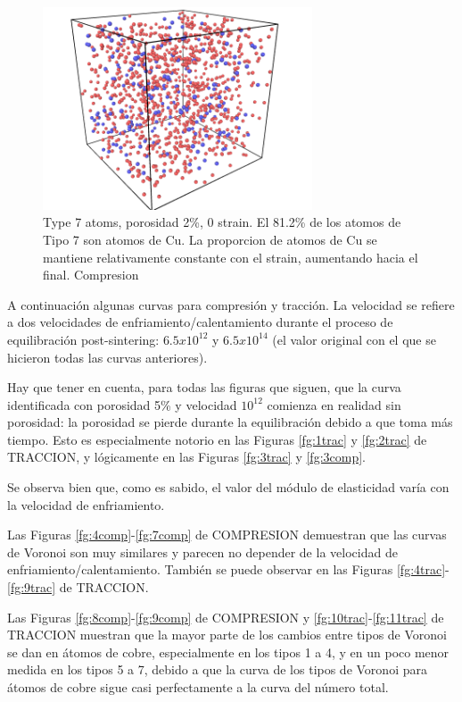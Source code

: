 \documentclass[10pt, oneside]{article} %
\begin{document}
\begin{figure}[H]
\centering
\includegraphics[width=8cm]{Figures/Porosidad_3_CU_tipo7.png}
\caption{Type 7 atoms, porosidad 2\%, 0 strain. El 81.2\% de los atomos de Tipo 7 son atomos de Cu. La proporcion de atomos de Cu se mantiene relativamente constante con el strain, aumentando hacia el final. Compresion}
\end{figure}

A continuación algunas curvas para compresión y tracción. La velocidad se refiere a dos velocidades de enfriamiento/calentamiento durante el proceso de equilibración post-sintering: $6.5x10^{12}$ y $6.5x10^{14}$ (el valor original con el que se hicieron todas las curvas anteriores). 

Hay que tener en cuenta, para todas las figuras que siguen, que la curva identificada con porosidad 5\% y velocidad $10^{12}$ comienza en realidad sin porosidad: la porosidad se pierde durante la equilibración debido a que toma más tiempo. Esto es especialmente notorio en las Figuras \ref{fg:1trac} y \ref{fg:2trac} de TRACCION, y lógicamente en las Figuras \ref{fg:3trac} y \ref{fg:3comp}.

Se observa bien que, como es sabido, el valor del módulo de elasticidad varía con la velocidad de enfriamiento.

Las Figuras \ref{fg:4comp}-\ref{fg:7comp} de COMPRESION demuestran que las curvas de Voronoi son muy similares y parecen no depender de la velocidad de enfriamiento/calentamiento. También se puede observar en las Figuras \ref{fg:4trac}-\ref{fg:9trac} de TRACCION.

Las Figuras \ref{fg:8comp}-\ref{fg:9comp} de COMPRESION y \ref{fg:10trac}-\ref{fg:11trac} de TRACCION muestran que la mayor parte de los cambios entre tipos de Voronoi se dan en átomos de cobre, especialmente en los tipos 1 a 4, y en un poco menor medida en los tipos 5 a 7, debido a que la curva de los tipos de Voronoi para átomos de cobre sigue casi perfectamente a la curva del número total.
\end{document}

